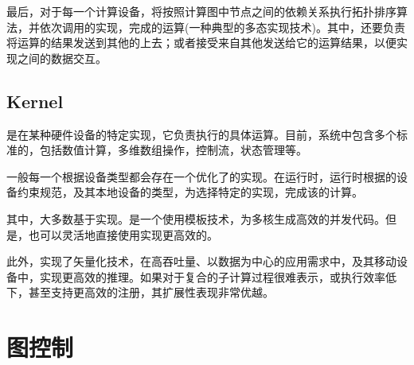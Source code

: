 \begin{content}
最后，对于每一个计算设备，将按照计算图中节点之间的依赖关系执行拓扑排序算法，并依次调用的实现，完成的运算(一种典型的多态实现技术)。其中，还要负责将运算的结果发送到其他的上去；或者接受来自其他发送给它的运算结果，以便实现之间的数据交互。

\subsection{Kernel}

是在某种硬件设备的特定实现，它负责执行的具体运算。目前，系统中包含多个标准的，包括数值计算，多维数组操作，控制流，状态管理等。

一般每一个根据设备类型都会存在一个优化了的实现。在运行时，运行时根据的设备约束规范，及其本地设备的类型，为选择特定的实现，完成该的计算。

其中，大多数基于实现。是一个使用模板技术，为多核生成高效的并发代码。但是，也可以灵活地直接使用实现更高效的。

此外，实现了矢量化技术，在高吞吐量、以数据为中心的应用需求中，及其移动设备中，实现更高效的推理。如果对于复合的子计算过程很难表示，或执行效率低下，甚至支持更高效的注册，其扩展性表现非常优越。

\end{content}

\section{图控制}

